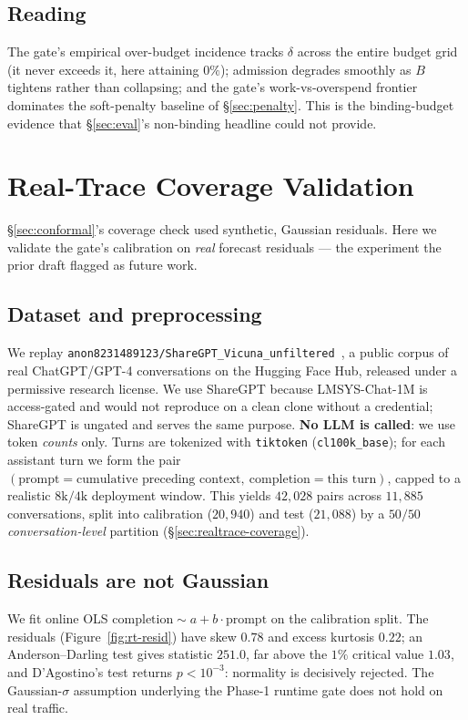 \documentclass[11pt]{article}
\theoremstyle{plain}
\theoremstyle{definition}
\theoremstyle{remark}
\begin{document}
\subsection{Reading}
The gate's empirical over-budget incidence tracks $\delta$ across the entire budget grid (it never exceeds it, here attaining $0\%$); admission degrades smoothly as $B$ tightens rather than collapsing; and the gate's work-vs-overspend frontier dominates the soft-penalty baseline of \S\ref{sec:penalty}. This is the binding-budget evidence that \S\ref{sec:eval}'s non-binding headline could not provide.

\section{Real-Trace Coverage Validation}\label{sec:realtrace}

\S\ref{sec:conformal}'s coverage check used synthetic, Gaussian residuals. Here we validate the gate's calibration on \emph{real} forecast residuals --- the experiment the prior draft flagged as future work.

\subsection{Dataset and preprocessing}
We replay \texttt{anon8231489123/ShareGPT\_Vicuna\_unfiltered}~\cite{sharegpt}, a public corpus of real ChatGPT/GPT-4 conversations on the Hugging Face Hub, released under a permissive research license. We use ShareGPT because LMSYS-Chat-1M is access-gated and would not reproduce on a clean clone without a credential; ShareGPT is ungated and serves the same purpose. \textbf{No LLM is called}: we use token \emph{counts} only. Turns are tokenized with \texttt{tiktoken} (\texttt{cl100k\_base}); for each assistant turn we form the pair $(\text{prompt}=\text{cumulative preceding context},\ \text{completion}=\text{this turn})$, capped to a realistic $8\text{k}/4\text{k}$ deployment window. This yields $42{,}028$ pairs across $11{,}885$ conversations, split into calibration ($20{,}940$) and test ($21{,}088$) by a $50/50$ \emph{conversation-level} partition (\S\ref{sec:realtrace-coverage}).

\subsection{Residuals are not Gaussian}
We fit online OLS $\text{completion}\sim a+b\cdot\text{prompt}$ on the calibration split. The residuals (Figure~\ref{fig:rt-resid}) have skew $0.78$ and excess kurtosis $0.22$; an Anderson--Darling test gives statistic $251.0$, far above the $1\%$ critical value $1.03$, and D'Agostino's test returns $p<10^{-3}$: normality is decisively rejected. The Gaussian-$\sigma$ assumption underlying the Phase-1 runtime gate does not hold on real traffic.
\end{document}
